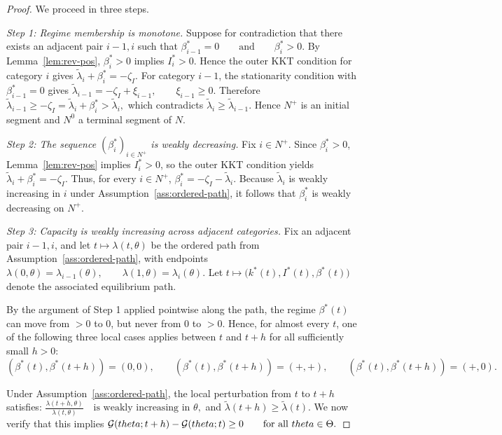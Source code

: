 \documentclass{class}
\begin{document}
\begin{proof}
We proceed in three steps.


\noindent\textit{Step 1: Regime membership is monotone.}
Suppose for contradiction that there exists an adjacent pair \(i-1,i\) such that
$\beta_{i-1}^\ast=0 \qquad\text{and}\qquad \beta_i^\ast>0.$
By Lemma~\ref{lem:rev-pos}, \(\beta_i^\ast>0\) implies \(I_i^\ast>0\). Hence the outer KKT condition for category \(i\) gives
$\tilde\lambda_i+\beta_i^\ast=-\zeta_I.$
For category \(i-1\), the stationarity condition with \(\beta_{i-1}^\ast=0\) gives
$\tilde\lambda_{i-1}=-\zeta_I+\xi_{i-1}, \qquad \xi_{i-1}\ge 0.$
Therefore
$\tilde\lambda_{i-1}\ge -\zeta_I=\tilde\lambda_i+\beta_i^\ast>\tilde\lambda_i,$
which contradicts \(\tilde\lambda_i\ge \tilde\lambda_{i-1}\). Hence \(N^+\) is an initial segment and \(N^0\) a terminal segment of \(N\).


\noindent\textit{Step 2: The sequence \((\beta_i^\ast)_{i\in N^+}\) is weakly decreasing.}
Fix \(i\in N^+\). Since \(\beta_i^\ast>0\), Lemma~\ref{lem:rev-pos} implies \(I_i^\ast>0\), so the outer KKT condition yields
$\tilde\lambda_i+\beta_i^\ast=-\zeta_I.$
Thus, for every \(i\in N^+\),
$\beta_i^\ast=-\zeta_I-\tilde\lambda_i.$
Because \(\tilde\lambda_i\) is weakly increasing in \(i\) under Assumption~\ref{ass:ordered-path}, it follows that \(\beta_i^\ast\) is weakly decreasing on \(N^+\).


\noindent\textit{Step 3: Capacity is weakly increasing across adjacent categories.}
Fix an adjacent pair \(i-1,i\), and let
$t\longmapsto \lambda(t,\theta)$
be the ordered path from Assumption~\ref{ass:ordered-path}, with endpoints
$\lambda(0,\theta)=\lambda_{i-1}(\theta), \qquad \lambda(1,\theta)=\lambda_i(\theta).$
Let
$t\longmapsto \bigl(k^\ast(t),I^\ast(t),\beta^\ast(t)\bigr)$
denote the associated equilibrium path.

By the argument of Step 1 applied pointwise along the path, the regime \(\beta^\ast(t)\) can move from \(>0\) to \(0\), but never from \(0\) to \(>0\). Hence, for almost every \(t\), one of the following three local cases applies between \(t\) and \(t+h\) for all sufficiently small \(h>0\):
\[
(\beta^\ast(t),\beta^\ast(t+h))=(0,0),\qquad
(\beta^\ast(t),\beta^\ast(t+h))=(+, +),\qquad
(\beta^\ast(t),\beta^\ast(t+h))=(+,0).
\]

Under Assumption~\ref{ass:ordered-path}, the local perturbation from \(t\) to \(t+h\) satisfies:
$\frac{\lambda(t+h,\theta)}{\lambda(t,\theta)} \quad\text{is weakly increasing in }\theta,$
and
$\tilde\lambda(t+h)\ge \tilde\lambda(t).$
We now verify that this implies
$\mathcal{G}(theta;t+h)-\mathcal{G}(theta;t)\ge 0 \qquad\text{for all }theta\in\Theta.$


\end{proof}
\end{document}
